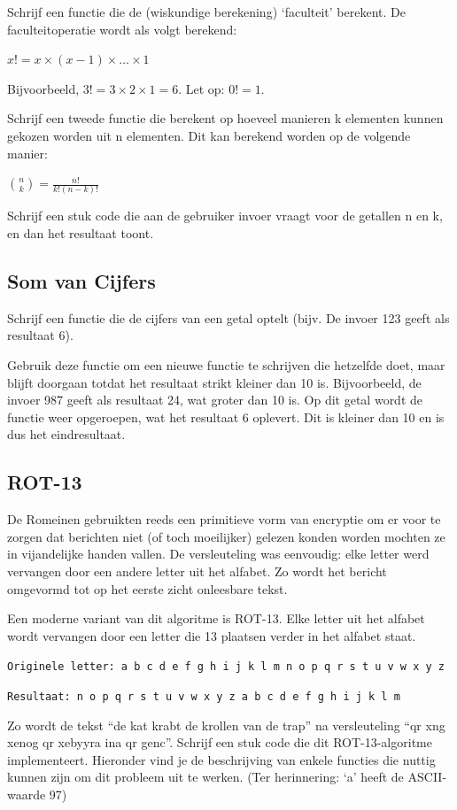 Schrijf een functie die de (wiskundige berekening) `faculteit' berekent. De faculteitoperatie wordt als volgt berekend:

$x! = x \times (x-1) \times \ldots \times 1$

Bijvoorbeeld, $3! = 3 \times 2 \times 1 = 6$. Let op: $0! = 1$.

Schrijf een tweede functie die berekent op hoeveel manieren k elementen kunnen gekozen worden uit n elementen. Dit kan berekend worden op de volgende manier:

$\binom{n}{k} = \frac{n!}{k!(n-k)!}$

Schrijf een stuk code die aan de gebruiker invoer vraagt voor de getallen n en k, en dan het resultaat toont.

\subsection{Som van Cijfers}

Schrijf een functie die de cijfers van een getal optelt (bijv. De invoer 123 geeft als resultaat 6).

Gebruik deze functie om een nieuwe functie te schrijven die hetzelfde doet, maar blijft doorgaan totdat het resultaat strikt kleiner dan 10 is. Bijvoorbeeld, de invoer 987 geeft als resultaat 24, wat groter dan 10 is. Op dit getal wordt de functie weer opgeroepen, wat het resultaat 6 oplevert. Dit is kleiner dan 10 en is dus het eindresultaat.

\subsection{ROT-13}

De Romeinen gebruikten reeds een primitieve vorm van encryptie om er voor te zorgen dat berichten niet (of toch moeilijker) gelezen konden worden mochten ze in vijandelijke handen vallen. De versleuteling was eenvoudig: elke letter werd vervangen door een andere letter uit het alfabet. Zo wordt het bericht omgevormd tot op het eerste zicht onleesbare tekst.

Een moderne variant van dit algoritme is ROT-13. Elke letter uit het alfabet wordt vervangen door een letter die 13 plaatsen verder in het alfabet staat.

\texttt{Originele letter: a b c d e f g h i j k l m n o p q r s t u v w x y z}

\texttt{Resultaat:        n o p q r s t u v w x y z a b c d e f g h i j k l m}

Zo wordt de tekst ``de kat krabt de krollen van de trap'' na versleuteling ``qr xng xenog qr xebyyra ina qr genc''. Schrijf een stuk code die dit ROT-13-algoritme implementeert. Hieronder vind je de beschrijving van enkele functies die nuttig kunnen zijn om dit probleem uit te werken. (Ter herinnering: `a' heeft de ASCII-waarde 97)

